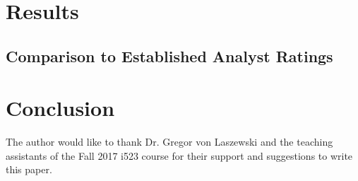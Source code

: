 \documentclass[sigconf]{acmart}
\begin{document}
\section{Results}

\subsection{Comparison to Established Analyst Ratings}


\section{Conclusion}


\begin{acks}

The author would like to thank Dr. Gregor von Laszewski and the teaching assistants of the Fall 2017 i523 course for their support and suggestions to write this paper.

\end{acks}


 
\end{document}
